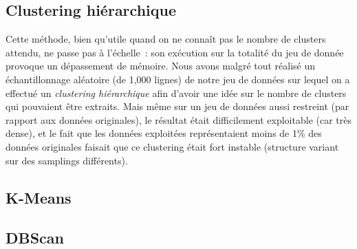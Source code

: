     \subsection{Clustering hiérarchique}
    Cette méthode, bien qu'utile quand on ne connaît pas le nombre de clusters attendu, ne passe pas à l'échelle~: son exécution sur la totalité du jeu de donnée provoque un dépassement de mémoire.
    Nous avons malgré tout réalisé un échantillonnage aléatoire (de 1,000 lignes) de notre jeu de données sur lequel on a effectué un \textit{clustering hiérarchique} afin d'avoir une idée sur le nombre de clusters qui pouvaient être extraits. Mais même sur un jeu de données aussi restreint (par rapport aux données originales), le résultat était difficilement exploitable (car très dense), et le fait que les données exploitées représentaient moins de 1\% des données originales faisait que ce clustering était fort instable (structure variant sur des samplings différents).

    \subsection{K-Means}


    \subsection{DBScan}
